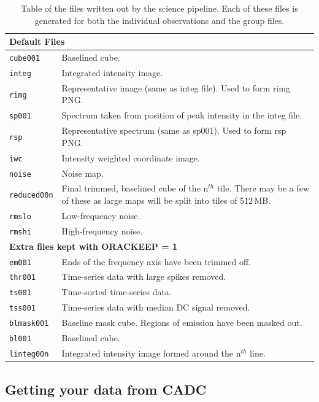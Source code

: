 \documentclass[twoside,11pt]{article}
\newcommand{\xlabel}[1]{}
\renewcommand{\_}{\texttt{\symbol{95}}}
\begin{document}
\begin{table}[h!]
\centering
\begin{tabular}{p{2.8cm}|p{11.8cm}}
\hline
\multicolumn{2}{l}{\textbf{Default Files}}\\
\hline
\texttt{cube001}& Baselined cube.\\
\texttt{integ}& Integrated intensity image. \\
\texttt{rimg}& Representative image (same as integ file). Used to form rimg PNG.\\
\texttt{sp001}& Spectrum taken from position of peak intensity in the integ file.\\
\texttt{rsp}&Representative spectrum (same as sp001). Used to form rsp PNG.\\
\texttt{iwc}& Intensity weighted coordinate image.\\
\texttt{noise}& Noise map.\\
\texttt{reduced00n}& Final trimmed, baselined cube of the n$^{th}$ tile. There may be a few of these as large maps will be split into tiles of 512\,MB.\\
\texttt{rmslo}& Low-frequency noise.\\
\texttt{rmshi}& High-frequency noise.\\
\hline
\multicolumn{2}{l}{\textbf{Extra files kept with ORAC\_KEEP = 1}}\\
\hline
\texttt{em001}& Ends of the frequency axis have been trimmed off.\\
\texttt{thr001}& Time-series data with large spikes removed.\\
\texttt{ts001}& Time-sorted time-series data.\\
\texttt{tss001}& Time-series data with median DC signal removed.  \\
\texttt{blmask001}& Baseline mask cube. Regions of emission have been
                   masked out. \\
\texttt{bl001}& Baselined cube.\\
\texttt{linteg00n}& Integrated intensity image formed around the n$^{th}$ line. \\
\hline
\end{tabular}
\label{tab:pipe-out}
\caption{\small Table of the files written out by the science pipeline. Each of these files is generated for both the individual observations and the group files.}
\end{table}


\subsection{\xlabel{cadc}Getting your data from CADC}
\end{document}
